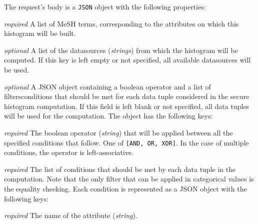 \begin{description}[labelwidth=5em, leftmargin=\dimexpr\labelwidth+\labelsep\relax]
     \item[Request:] The request's body is a \texttt{JSON} object with the following properties:

\begin{description}[labelwidth=6em, leftmargin=\dimexpr\labelwidth+\labelsep\relax]

    \item[\texttt{attributes}:] {\color{red}\textit{required}} A list of MeSH terms, corresponding to the attributes on which this histogram will be built.

    \item[\texttt{datasources}:] {\color{blue}\textit{optional}} A list of the datasources (\textit{strings}) from which the histogram will be computed.
    If this key is left empty or not specified, all available datasources will be used.

    \item[\texttt{filters}:] {\color{blue}\textit{optional}} A JSON object containing a boolean operator and a list of filters\myslash conditions that should be met for each data tuple considered in the secure histogram computation.
    If this field is left blank or not specified, all data tuples will be used for the computation.
    The object has the following keys:

    \begin{description}[labelwidth=6em, leftmargin=\dimexpr\labelwidth+\labelsep\relax]
        \item[\texttt{operator}:] {\color{red}\textit{required}} The boolean operator (\textit{string}) that will be applied between all the specified conditions that follow.
        One of \texttt{[AND, OR, XOR]}.
        In the case of multiple conditions, the operator is left\hyp associative.

        \item[\texttt{conditions}:] {\color{red}\textit{required}} The list of conditions that should be met by each data tuple in the computation.
        Note that the only filter that can be applied in categorical values is the equality checking.
        Each condition is represented as a JSON object with the following keys:

        \begin{description}[labelwidth=5em, leftmargin=\dimexpr\labelwidth+\labelsep\relax]
            \item[\texttt{attribute}:] {\color{red}\textit{required}} The name of the attribute (\textit{string}).


\end{description}
\end{description}
\end{description}
\end{description}
